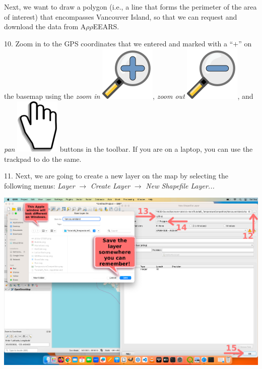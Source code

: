 \documentclass[oneside,a4paper,11pt,explicit]{book}
\begin{document}
	Next, we want to draw a polygon (i.e., a line that forms the perimeter of the area of interest) that encompasses Vancouver Island, so that we can request and download the data from A$\rho\rho$EEARS.
	
	10. Zoom in to the GPS coordinates that we entered and marked with a ``$+$'' on the basemap using the \textit{zoom in} \includegraphics[height=\fontcharht\font`\B]{mActionZoomIn.png}, \textit{zoom out} \includegraphics[height=\fontcharht\font`\B]{mActionZoomOut.png}, and \textit{pan} \includegraphics[height=\fontcharht\font`\B]{mActionPan.png} buttons in the toolbar. If you are on a laptop, you can use the trackpad to do the same.
	
	11. Next, we are going to create a new layer on the map by selecting the following menus: \textit{Layer} $\rightarrow$ \textit{Create Layer} $\rightarrow$ \textit{New Shapefile Layer...}
	
	\centerline{\includegraphics[width=.9\textwidth]{SaveLayer.png}}
	
\end{document}
